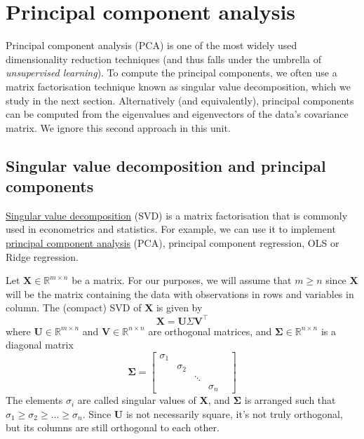 \documentclass{scrartcl}
\begin{document}
    \hypertarget{principal-component-analysis}{%
\section{Principal component
analysis}\label{principal-component-analysis}}

Principal component analysis (PCA) is one of the most widely used
dimensionality reduction techniques (and thus falls under the umbrella
of \emph{unsupervised learning}). To compute the principal components,
we often use a matrix factorisation technique known as singular value
decomposition, which we study in the next section. Alternatively (and
equivalently), principal components can be computed from the eigenvalues
and eigenvectors of the data's covariance matrix. We ignore this second
approach in this unit.

    \hypertarget{singular-value-decomposition-and-principal-components}{%
\subsection{Singular value decomposition and principal
components}\label{singular-value-decomposition-and-principal-components}}

\href{https://en.wikipedia.org/wiki/Singular_value_decomposition}{Singular
value decomposition} (SVD) is a matrix factorisation that is commonly
used in econometrics and statistics. For example, we can use it to
implement
\href{https://en.wikipedia.org/wiki/Principal_component_analysis}{principal
component analysis} (PCA), principal component regression, OLS or Ridge
regression.

Let \(\mathbf{X} \in \mathbb{R}^{m\times n}\) be a matrix. For our
purposes, we will assume that \(m \geq n\) since \(\mathbf{X}\) will be
the matrix containing the data with observations in rows and variables
in column. The (compact) SVD of \(\mathbf{X}\) is given by \[
\mathbf{X} = \mathbf{U} \Sigma \mathbf{V}^\top
\] where \(\mathbf{U} \in \mathbb{R}^{m\times n}\) and
\(\mathbf{V} \in \mathbb{R}^{n\times n}\) are orthogonal matrices, and
\(\bm\Sigma \in \mathbb{R}^{n \times n}\) is a diagonal matrix \[
\bm\Sigma =  \begin{bmatrix} 
    \sigma_1 & & & & \\
     & \sigma_2 & & & \\
     & & \ddots & & \\
     & & & \sigma_n & 
\end{bmatrix}
\] The elements \(\sigma_i\) are called singular values of
\(\mathbf{X}\), and \(\bm\Sigma\) is arranged such that
\(\sigma_1 \geq \sigma_2 \geq \dots \geq \sigma_n\). Since
\(\mathbf{U}\) is not necessarily square, it's not truly orthogonal, but
its columns are still orthogonal to each other.
\end{document}

